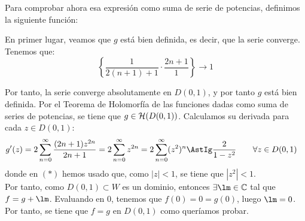 \begin{ejercicio}
    Para comprobar ahora esa expresión como suma de serie de potencias, definimos la siguiente función:

    En primer lugar, veamos que $g$ está bien definida, es decir, que la serie converge. Tenemos que:
    \begin{equation*}
        \left\{\dfrac{1}{2(n+1)+1}\cdot \dfrac{2n+1}{1}\right\}\to 1
    \end{equation*}

    Por tanto, la serie converge absolutamente en $D(0,1)$, y por tanto $g$ está bien definida. Por el Teorema de Holomorfía de las funciones dadas como suma de series de potencias, se tiene que $g\in \mathcal{H}(D(0,1))$. Calculamos su derivada para cada $z\in D(0,1)$:
    \begin{align*}
        g'(z) &= 2\sum_{n=0}^\infty \frac{(2n+1)z^{2n}}{2n+1} = 2\sum_{n=0}^\infty z^{2n} = 2\sum_{n=0}^\infty (z^2)^{n}
        \AstIg \dfrac{2}{1-z^2}\qquad \forall z\in D(0,1)
    \end{align*}
    donde en $(\ast)$ hemos usado que, como $|z|<1$, se tiene que $|z^2|<1$.\\

    Por tanto, como $D(0,1)\subset W$ es un dominio, entonces $\exists \lm\in \bb{C}$ tal que $f=g+\lm$. Evaluando en $0$, tenemos que $f(0)=0=g(0)$, luego $\lm=0$. Por tanto, se tiene que $f=g$ en $D(0,1)$ como queríamos probar.
\end{ejercicio}

